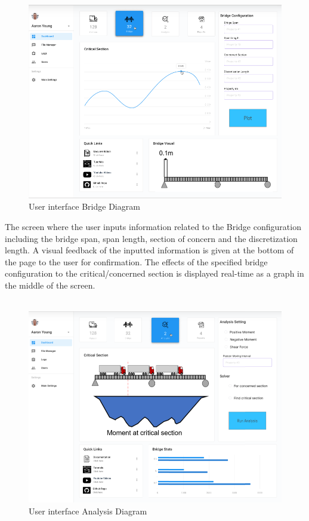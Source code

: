 \documentclass[12pt, titlepage]{article}
\begin{document}
\begin{figure}[H]
  \includegraphics[]{../images/Userinterface-Bridge.PNG}
  \caption{User interface Bridge Diagram}
  \label{fig:userinterface-bridge-diagram}
\end{figure}
The screen where the user inputs information related to the Bridge configuration including the bridge span, span length, section of concern and the discretization length. A visual feedback of the inputted information is given at the bottom of the page to the user for confirmation. The effects of the specified bridge configuration to the critical/concerned section is displayed real-time as a graph in the middle of the screen.\\\\
\begin{figure}[H]
  \includegraphics[]{../images/Userinterface-Analysis.PNG}
  \caption{User interface Analysis Diagram}
  \label{fig:userinterface-analysis-diagram}
\end{figure}
\end{document}
